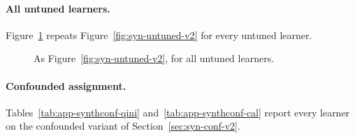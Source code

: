 \documentclass{article}
\begin{document}
\paragraph{All untuned learners.}
Figure~\ref{fig:syn-untuned-all} repeats Figure~\ref{fig:syn-untuned-v2} for
every untuned learner.

\begin{figure}[H]
\centering
{}
\caption{As Figure~\ref{fig:syn-untuned-v2}, for all untuned learners.}
\label{fig:syn-untuned-all}
\end{figure}

\paragraph{Confounded assignment.}
Tables~\ref{tab:app-synthconf-qini} and~\ref{tab:app-synthconf-cal} report
every learner on the confounded variant of Section~\ref{sec:syn-conf-v2}.
\end{document}
